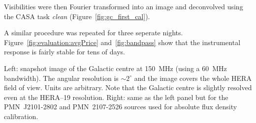 \documentclass[a0,portrait]{a0poster}
\begin{document}
\begin{multicols}{2}
\noindent
Visibilities were then Fourier transformed into an image and deconvolved using the CASA task {\it clean} (Figure~\ref{fig:gc_first_cal}).

\noindent
A similar procedure was repeated for three seperate nights. Figure~\ref{fig:evaluation:avgPrice} and~\ref{fig:bandpass} show that the instrumental response is fairly stable for tens of days.

\begin{minipage}{\columnwidth}
    \makeatletter
    \newcommand{\@captype}{figure}
    \makeatother
    \centering
    \qquad%
    \caption{Left: snapshot image of the Galactic centre at 150~MHz (using a 60~MHz bandwidth). The angular resolution is $\sim 2^\circ$ and the image covers the whole HERA field of view. Units are arbitrary. Note that the Galactic centre is slightly resolved even at the HERA--19 resolution. Right: same as the left panel but for the PMN~J2101-2802 and PMN~2107-2526 sources used for absolute flux density calibration.}
\label{fig:gc_first_cal}
  \end{minipage}
%

\end{multicols}
\end{document}

